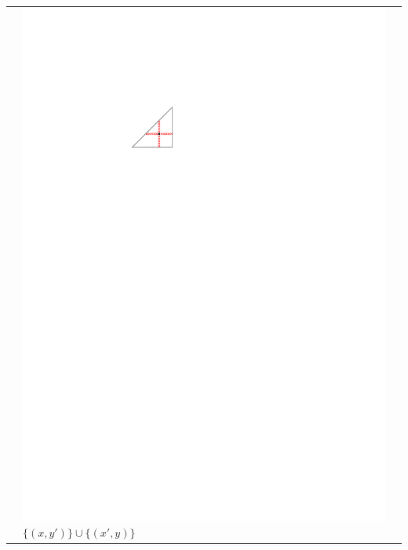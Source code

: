 \documentclass{patmorin}
\begin{document}
\begin{table}
\begin{center}
\begin{tabular}{m{1ex}|>{\centering\arraybackslash}m{}|>{\centering\arraybackslash}m{}}
         & \includegraphics[scale=.8]{figs/killersb-2} \break%
           $\{(x,y')\} \cup \{(x',y)\}$ \\

\end{tabular}
\end{center}
\end{table}
\end{document}
